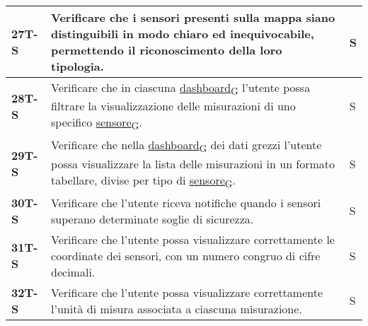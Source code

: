 \begin{longtable}{|>{\raggedright\arraybackslash}m{}|>{\raggedright\arraybackslash}m{}|>{\raggedright\arraybackslash}m{}|}
	\hline
	\textbf{27T-S}  & Verificare che i sensori presenti sulla mappa siano distinguibili in modo chiaro ed inequivocabile, permettendo il riconoscimento della loro tipologia.                                                                                                                                                                                                                                                  & S              \\
	\hline
	\textbf{28T-S}  & Verificare che in ciascuna \href{https://7last.github.io/docs/pb/documentazione-interna/glossario\#dashboard}{dashboard\textsubscript{G}} l’utente possa filtrare la visualizzazione delle misurazioni di uno specifico \href{https://7last.github.io/docs/pb/documentazione-interna/glossario\#sensore}{sensore\textsubscript{G}}.                                                                      & S              \\
	\hline
	\textbf{29T-S}  & Verificare che nella \href{https://7last.github.io/docs/pb/documentazione-interna/glossario\#dashboard}{dashboard\textsubscript{G}} dei dati grezzi l’utente possa visualizzare la lista delle misurazioni in un formato tabellare, divise per tipo di \href{https://7last.github.io/docs/pb/documentazione-interna/glossario\#sensore}{sensore\textsubscript{G}}.                                       & S              \\ %
	\hline
	\textbf{30T-S}  & Verificare che l’utente riceva notifiche quando i sensori superano determinate soglie di sicurezza.                                                                                                                                                                                                                                                                                                      & S              \\
	\hline
	\textbf{31T-S}  & Verificare che l’utente possa visualizzare correttamente le coordinate dei sensori, con un numero congruo di cifre decimali.                                                                                                                                                                                                                                                                             & S              \\
	\hline
	\textbf{32T-S}  & Verificare che l’utente possa visualizzare correttamente l’unità di misura associata a ciascuna misurazione.                                                                                                                                                                                                                                                                                             & S              \\

\end{longtable}
